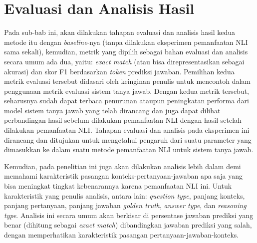 \section{Evaluasi dan Analisis Hasil}
\label{3.5}
Pada sub-bab ini, akan dilakukan tahapan evaluasi dan analisis hasil kedua metode itu dengan \emph{baseline}-nya (tanpa dilakukan eksperimen pemanfaatan NLI sama sekali), kemudian, metrik yang dipilih sebagai bahan evaluasi dan analisis secara umum ada dua, yaitu: \emph{exact match} (atau bisa direpresentasikan sebagai akurasi) dan skor F1 berdasarkan \emph{token} prediksi jawaban. Pemilihan kedua metrik evaluasi tersebut didasari oleh keinginan penulis untuk mencontoh \citep{rajpurkar-etal-2016-squad} dalam penggunaan metrik evaluasi sistem tanya jawab. Dengan kedua metrik tersebut, seharusnya sudah dapat terbaca penurunan ataupun peningkatan performa dari model sistem tanya jawab yang telah dirancang dan juga dapat dilihat perbandingan hasil sebelum dilakukan pemanfaatan NLI dengan hasil setelah dilakukan pemanfaatan NLI. Tahapan evaluasi dan analisis pada eksperimen ini dirancang dan ditujukan untuk mengetahui pengaruh dari suatu parameter yang dimasukkan ke dalam suatu metode pemanfaatan NLI untuk sistem tanya jawab.

Kemudian, pada penelitian ini juga akan dilakukan analisis lebih dalam demi memahami karakteristik pasangan konteks-pertanyaan-jawaban apa saja yang bisa meningkat tingkat kebenarannya karena pemanfaatan NLI ini. Untuk karakteristik yang penulis analisis, antara lain: \emph{question type}, panjang konteks, panjang pertanyaan, panjang jawaban \emph{golden truth}, \emph{answer type}, dan \emph{reasoning type}. Analisis ini secara umum akan berkisar di persentase jawaban prediksi yang benar (dihitung sebagai \emph{exact match}) dibandingkan jawaban prediksi yang salah, dengan memperhatikan karakteristik pasangan pertanyaan-jawaban-konteks.